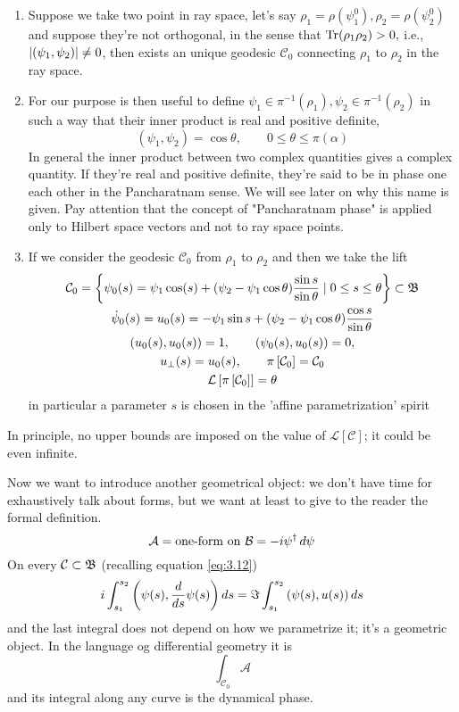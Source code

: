 \begin{enumerate}[i]
	\item Suppose we take two point in ray space, let's say $ \rho_1=\rho(\psi_1^0),\rho_2=\rho(\psi_2^0) $ and suppose they're not orthogonal, in the sense that $ \mathrm{Tr}(\rho_1\rho_2)>0, $ i.e., $ \lvert\left(\psi_1,\psi_2\right)\rvert\neq 0 $, then exists an unique geodesic $ \mathcal{C}_0 $ connecting $ \rho_1 $ to $ \rho_2 $ in the ray space.
	\item For our purpose is then useful to define $ \psi_1\in\pi^{-1}(\rho_1), \psi_2\in\pi^{-1}(\rho_2) $ in such a way that their inner product is real and positive definite, 
	\begin{equation}
	\left(\psi_1,\psi_2 \right)=\cos\theta, \qquad 0\leq \theta\leq\pi(\alpha)
	\end{equation}
	In general the inner product between two complex quantities gives a complex quantity. If they're real and positive definite, they're said to be in phase one each other in the Pancharatnam sense. We will see later on why this name is given. Pay attention that the concept of "Pancharatnam phase" is applied only to Hilbert space vectors and not to ray space points.
	\item If we consider the geodesic $ \mathcal{C}_0 $ from $ \rho_1 $ to $ \rho_2 $ and then we take the lift
	\begin{gather}
	\mathcal{C}_0=\left\{\psi_0(s)=\psi_1\cos(s)+(\psi_2-\psi_1\cos\theta)\frac{\sin s}{\sin\theta}\mid 0\leq s\leq\theta \right\}\subset\mathfrak{B}\\
	\dot{\psi}_0(s)=u_0(s)=-\psi_1\sin s+(\psi_2-\psi_1\cos\theta)\dfrac{\cos s}{\sin \theta}\\
	(u_0(s),u_0(s))=1, \qquad (\psi_0(s),u_0(s))=0,\\
	u_{\perp}(s)=u_0(s),\qquad \pi\left[\mathcal{C}_0 \right]=\mathcal{C}_0\\
	\mathcal{L}\left[\pi\left[\mathcal{C}_0 \right] \right]=\theta
	\end{gather}
	in particular a parameter $ s $ is chosen in the 'affine parametrization' spirit
\end{enumerate}
In principle, no upper bounds are imposed on the value of $ \mathcal{L}\left[\mathcal{C}\right] $; it could be even infinite.

Now we want to introduce another geometrical object: we don't have time for exhaustively talk about forms, but we want at least to give to the reader the formal definition.
\begin{equation}
\mathcal{A}=\text{one-form on $ \mathcal{B} $} = -i\psi^{\dagger}\mathop{}\!d \psi
\end{equation}
On every $ \mathcal{C}\subset\mathfrak{B} $ (recalling equation \eqref{eq:3.12})
\begin{equation}
\-i\int_{s_1}^{s_2}\left(\psi(s),\frac{d}{ds}\psi(s)\right)\mathop{}\!d s=\Im\int_{s_1}^{s_2}\left(\psi(s),u(s)\right)\mathop{}\!d s
\end{equation}
and the last integral does not depend on how we parametrize it; it's a geometric object.
In the language og differential geometry it is 
\begin{equation}
\int_{\mathcal{C}_0}\mathcal{A}
\end{equation}
and its integral along any curve is the dynamical phase.

